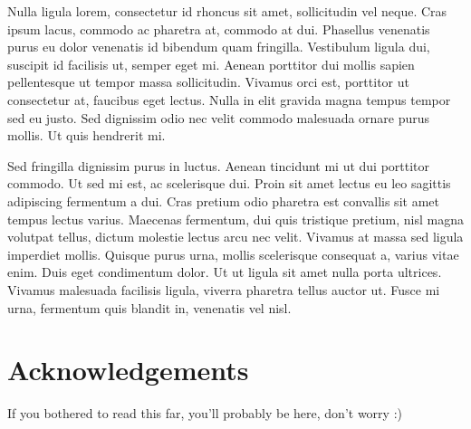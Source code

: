 \documentclass[oneside,11pt]{Classes/PhDthesisPSnPDF}
\begin{document}
\cleardoublepage

\begin{zusamm}
 Nulla ligula lorem, consectetur id rhoncus sit amet, sollicitudin vel neque. Cras ipsum lacus, commodo ac pharetra at, commodo at dui. Phasellus venenatis purus eu dolor venenatis id bibendum quam fringilla. Vestibulum ligula dui, suscipit id facilisis ut, semper eget mi. Aenean porttitor dui mollis sapien pellentesque ut tempor massa sollicitudin. Vivamus orci est, porttitor ut consectetur at, faucibus eget lectus. Nulla in elit gravida magna tempus tempor sed eu justo. Sed dignissim odio nec velit commodo malesuada ornare purus mollis. Ut quis hendrerit mi.

Sed fringilla dignissim purus in luctus. Aenean tincidunt mi ut dui porttitor commodo. Ut sed mi est, ac scelerisque dui. Proin sit amet lectus eu leo sagittis adipiscing fermentum a dui. Cras pretium odio pharetra est convallis sit amet tempus lectus varius. Maecenas fermentum, dui quis tristique pretium, nisl magna volutpat tellus, dictum molestie lectus arcu nec velit. Vivamus at massa sed ligula imperdiet mollis. Quisque purus urna, mollis scelerisque consequat a, varius vitae enim. Duis eget condimentum dolor. Ut ut ligula sit amet nulla porta ultrices. Vivamus malesuada facilisis ligula, viverra pharetra tellus auctor ut. Fusce mi urna, fermentum quis blandit in, venenatis vel nisl.

\end{zusamm}


\setcounter{secnumdepth}{3} %
\setcounter{tocdepth}{3}    %
\tableofcontents            %


\newpage
\mainmatter
\newpage























\newpage
\chapter*{Acknowledgements}

If you bothered to read this far, you'll probably be here, don't worry :)
\end{document}
